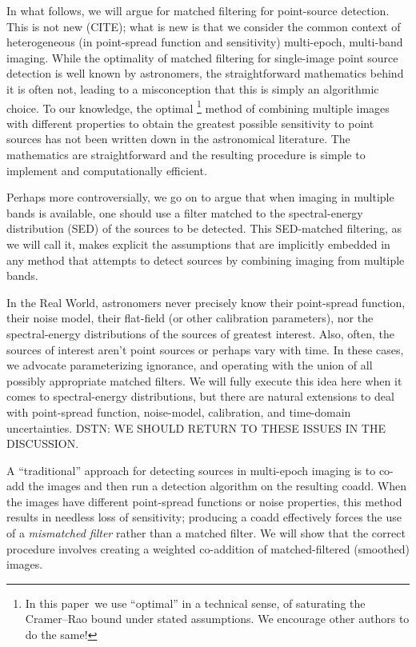 \documentclass[letterpaper,preprint]{aastex}
\newcommand{\doctype}{paper}
\begin{document}
In what follows, we will argue for matched filtering for point-source
detection.  This is not new (CITE); what is new is that we consider
the common context of heterogeneous (in point-spread function and
sensitivity) multi-epoch, multi-band imaging.
%
While the optimality of matched filtering for single-image point
source detection is well known by astronomers, the straightforward
mathematics behind it is often not, leading to a misconception that
this is simply an algorithmic choice.  To our knowledge, the optimal%
\footnote{In this \doctype\ we use ``optimal'' in a technical sense,
  of saturating the Cramer--Rao bound under stated assumptions.  We
  encourage other authors to do the same!}
method of combining multiple images with different properties to
obtain the greatest possible sensitivity to point sources has not been
written down in the astronomical literature.  The mathematics are
straightforward and the resulting procedure is simple to implement and
computationally efficient.

Perhaps more controversially, we go on to argue that when imaging in
multiple bands is available, one should use a filter matched to the
spectral-energy distribution (SED) of the sources to be detected.
This SED-matched filtering, as we will call it, makes explicit the
assumptions that are implicitly embedded in any method that attempts
to detect sources by combining imaging from multiple bands.

In the Real World, astronomers never precisely know their point-spread
function, their noise model, their flat-field (or other calibration
parameters), nor the spectral-energy distributions of the sources of
greatest interest.
Also, often, the sources of interest aren't point sources or perhaps
vary with time.
In these cases, we advocate parameterizing ignorance, and operating
with the union of all possibly appropriate matched filters.
We will fully execute this idea here when it comes to spectral-energy
distributions, but there are natural extensions to deal with
point-spread function, noise-model, calibration, and time-domain
uncertainties.
DSTN: WE SHOULD RETURN TO THESE ISSUES IN THE DISCUSSION.


A ``traditional'' approach for detecting sources in multi-epoch
imaging is to co-add the images and then run a detection algorithm on
the resulting coadd.  When the images have different point-spread
functions or noise properties, this method results in needless loss of
sensitivity; producing a coadd effectively forces the use of a
\emph{mismatched filter} rather than a matched filter.  We will show
that the correct procedure involves creating a weighted co-addition of
matched-filtered (smoothed) images.
\end{document}
